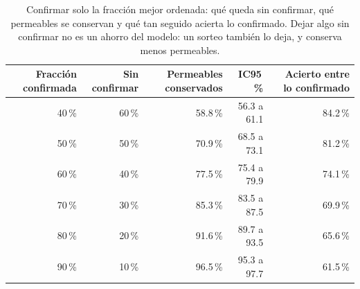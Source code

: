 \documentclass[letterpaper,11pt]{article}
\begin{document}
\begin{table}[h]
\centering
\caption{Confirmar solo la fracción mejor ordenada: qué queda sin confirmar, qué permeables se conservan y qué tan seguido acierta lo confirmado. Dejar algo sin confirmar no es un ahorro del modelo: un sorteo también lo deja, y conserva menos permeables.}
\label{tab:ahorro}
\small
\begin{tabular}{rrrrr}
\toprule
Fracción confirmada & Sin confirmar & Permeables conservados & IC95\,\% & Acierto entre lo confirmado\\
\midrule
40\,\% & 60\,\% & 58.8\,\% & 56.3 a 61.1 & 84.2\,\%\\
50\,\% & 50\,\% & 70.9\,\% & 68.5 a 73.1 & 81.2\,\%\\
60\,\% & 40\,\% & 77.5\,\% & 75.4 a 79.9 & 74.1\,\%\\
70\,\% & 30\,\% & 85.3\,\% & 83.5 a 87.5 & 69.9\,\%\\
80\,\% & 20\,\% & 91.6\,\% & 89.7 a 93.5 & 65.6\,\%\\
90\,\% & 10\,\% & 96.5\,\% & 95.3 a 97.7 & 61.5\,\%\\
\bottomrule
\end{tabular}
\end{table}
\end{document}
